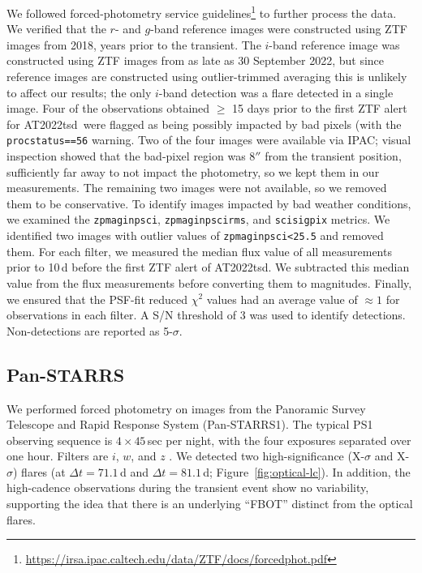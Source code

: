 \documentclass{nature_plusfigure}
\newcommand{\at}{AT2022tsd}
\begin{document}
\begin{methods}
We followed forced-photometry service guidelines\footnote{\url{https://irsa.ipac.caltech.edu/data/ZTF/docs/forcedphot.pdf}} to further process the data.
We verified that the $r$- and $g$-band reference images were constructed using ZTF images from 2018, years prior to the transient. The $i$-band reference image was constructed using ZTF images from as late as 30 September 2022, but since reference images are constructed using outlier-trimmed averaging\cite{Masci2018} this is unlikely to affect our results; the only $i$-band detection was a flare detected in a single image. 
Four of the observations obtained $\geq$ 15 days prior to the first ZTF alert for \at\ were flagged as being possibly impacted by bad pixels (with the \texttt{procstatus==56} warning.
Two of the four images were available via IPAC; visual inspection showed that the bad-pixel region was 8$''$ from the transient position, sufficiently far away to not impact the photometry, so we kept them in our measurements.
The remaining two images were not available, so we removed them to be conservative.
To identify images impacted by bad weather conditions, we examined the \texttt{zpmaginpsci}, \texttt{zpmaginpscirms}, and \texttt{scisigpix} metrics. We identified two images with outlier values of \texttt{zpmaginpsci<25.5} and removed them.
For each filter, we measured the median flux value of all measurements prior to 10\,d before the first ZTF alert of \at. We subtracted this median value from the flux measurements before converting them to magnitudes.
Finally, we ensured that the PSF-fit reduced $\chi^2$ values had an average value of $\approx1$ for observations in each filter.
A S/N threshold of 3 was used to identify detections. Non-detections are reported as 5-$\sigma$.

\subsection{Pan-STARRS}
\label{sec:panstarrs}

We performed forced photometry on images from the Panoramic Survey Telescope and Rapid Response System (Pan-STARRS1\cite{Chambers2016}).
The typical PS1 observing sequence is $4\times45$\,sec per night, with the
four exposures separated over one hour. Filters are $i$, $w$, and $z$ \cite{Tonry2012}.
We detected two high-significance (X-$\sigma$ and X-$\sigma$) flares (at $\Delta t=71.1$\,d and $\Delta t=81.1\,$d; Figure~\ref{fig:optical-lc}).
In addition, the high-cadence observations during the transient event show no variability, supporting the idea that there is an underlying ``FBOT'' distinct from the optical flares.


\end{methods}
\end{document}
